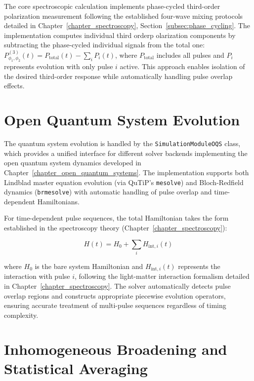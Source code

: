 \noindent
The core spectroscopic calculation implements phase-cycled third-order polarization measurement following the established four-wave mixing protocols detailed in Chapter~\ref{chapter_spectroscopy}, Section~\ref{subsec:phase_cycling}.
\noindent
The implementation computes individual third orderp olarization components by subtracting the phase-cycled individual signals from the total one:
$P_{\phi_1,\phi_2}^{(3)}(t) = P_{\text{total}}(t) - \sum_i P_i(t)$, where $P_{\text{total}}$ includes all pulses and $P_i$ represents evolution with only pulse $i$ active. This approach enables isolation of the desired third-order response while automatically handling pulse overlap effects.

\section{Open Quantum System Evolution}
\label{sec:oqs_evolution}

\noindent
The quantum system evolution is handled by the \texttt{SimulationModuleOQS} class, which provides a unified interface for different solver backends implementing the open quantum system dynamics developed in Chapter~\ref{chapter_open_quantum_systems}. The implementation supports both Lindblad master equation evolution (via QuTiP's \texttt{mesolve}) and Bloch-Redfield dynamics (\texttt{brmesolve}) with automatic handling of pulse overlap and time-dependent Hamiltonians.

\noindent
For time-dependent pulse sequences, the total Hamiltonian takes the form established in the spectroscopy theory (Chapter~\ref{chapter_spectroscopy}):

\begin{equation}
	\label{eq:time_dependent_hamiltonian}
	H(t) = H_0 + \sum_{i} H_{\text{int},i}(t)
\end{equation}

\noindent
where $H_0$ is the bare system Hamiltonian and $H_{\text{int},i}(t)$ represents the interaction with pulse $i$, following the light-matter interaction formalism detailed in Chapter~\ref{chapter_spectroscopy}. The solver automatically detects pulse overlap regions and constructs appropriate piecewise evolution operators, ensuring accurate treatment of multi-pulse sequences regardless of timing complexity.

\section{Inhomogeneous Broadening and Statistical Averaging}
\label{sec:inhomogeneous_broadening}

